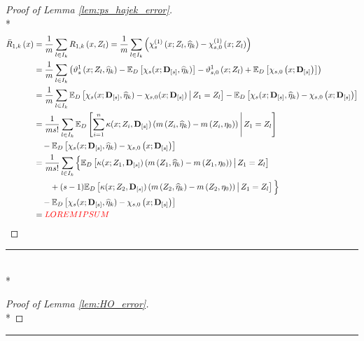 \begin{proof}[Proof of Lemma \ref{lem:ps_hajek_error}]\mbox{}\\*
    \begin{equation}
        \begin{aligned}
            \bar{R}_{1, k}\left(x\right)
            & = \frac{1}{m}\sum_{l \in I_{k}}R_{1, k}\left(x, Z_{l}\right)
            = \frac{1}{m}\sum_{l \in I_{k}}
            \left(\chi_{s}^{(1)}\left(x; Z_l, \widehat{\eta}_{k}\right) - \chi_{s,0}^{(1)}\left(x; Z_l\right)\right) \\
            & = \frac{1}{m}\sum_{l \in I_{k}}
            \left(\vartheta_{s}^{1}\left(x; Z_l, \widehat{\eta}_{k}\right)
            - \mathbb{E}_{D}\left[\chi_{s}(x; \mathbf{D}_{[s]}, \widehat{\eta}_{k})\right]
            - \vartheta_{s,0}^{1}\left(x; Z_l\right) 
            + \mathbb{E}_{D}\left[\chi_{s,0}\left(x; \mathbf{D}_{[s]}\right)\right]\right)\\
            & = \frac{1}{m}\sum_{l \in I_{k}}
            \mathbb{E}_{D}\left[\chi_{s}(x; \mathbf{D}_{[s]}, \widehat{\eta}_{k}) - \chi_{s,0}(x; \mathbf{D}_{[s]})\, \middle| \, Z_1 = Z_l \right]
            - \mathbb{E}_{D}\left[\chi_{s}(x; \mathbf{D}_{[s]}, \widehat{\eta}_{k}) - \chi_{s,0}\left(x; \mathbf{D}_{[s]}\right)\right] \\
            & = \frac{1}{m s!}\sum_{l \in I_{k}}
            \mathbb{E}_{D}\left[\sum_{i = 1}^{n}\kappa(x; Z_{i}, \mathbf{D}_{[s]})
            \left(m\left(Z_{i}, \widehat{\eta}_{k}\right) - m\left(Z_{i}, \eta_{0}\right)\right) \, \middle| \, Z_1 = Z_l \right] \\
            & \quad - \mathbb{E}_{D}\left[\chi_{s}(x; \mathbf{D}_{[s]}, \widehat{\eta}_{k}) - \chi_{s,0}\left(x; \mathbf{D}_{[s]}\right)\right] \\
            & = \frac{1}{m s!}\sum_{l \in I_{k}}
            \Big\{\mathbb{E}_{D}\left[\kappa(x; Z_{1}, \mathbf{D}_{[s]})
            \left(m\left(Z_{1}, \widehat{\eta}_{k}\right) - m\left(Z_{1}, \eta_{0}\right)\right) \, \middle| \, Z_1 = Z_l \right]  \\
            & \quad \quad  + (s-1)\mathbb{E}_{D}\left[\kappa(x; Z_{2}, \mathbf{D}_{[s]})
            \left(m\left(Z_{2}, \widehat{\eta}_{k}\right) - m\left(Z_{2}, \eta_{0}\right)\right) \, \middle| \, Z_1 = Z_l \right]
            \Big\} \\
            & \quad - \mathbb{E}_{D}\left[\chi_{s}(x; \mathbf{D}_{[s]}, \widehat{\eta}_{k}) - \chi_{s,0}\left(x; \mathbf{D}_{[s]}\right)\right] \\
            & = {\color{red} LOREM IPSUM}
        \end{aligned}
    \end{equation}    

\end{proof}

\hrule

\begin{lem}\label{lem:HO_error}\mbox{}\\*
    
\end{lem}

\begin{proof}[Proof of Lemma \ref{lem:HO_error}]\mbox{}\\*
    
\end{proof}

\hrule